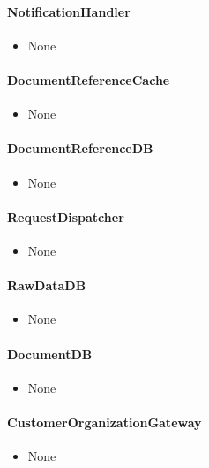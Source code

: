 \documentclass[a4paper,10pt]{article}
\begin{document}
\paragraph{NotificationHandler}
\begin{itemize}
	\item None
\end{itemize}

\paragraph{DocumentReferenceCache}
\begin{itemize}
	\item None
\end{itemize}

\paragraph{DocumentReferenceDB}
\begin{itemize}
	\item None
\end{itemize}

\paragraph{RequestDispatcher}
\begin{itemize}
	\item None
\end{itemize}

\paragraph{RawDataDB}
\begin{itemize}
	\item None
\end{itemize}

\paragraph{DocumentDB}
\begin{itemize}
	\item None
\end{itemize}

\paragraph{CustomerOrganizationGateway}
\begin{itemize}
	\item None
\end{itemize}
\end{document}
